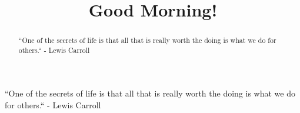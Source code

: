 \documentclass{ximera}
\title{Good Morning!}
\begin{document}
\begin{abstract}
``One of the secrets of life is that all that is really worth the doing is what we do for others.`` - Lewis Carroll
\end{abstract}
\maketitle

``One of the secrets of life is that all that is really worth the doing is what we do for others.`` - Lewis Carroll
\end{document}
